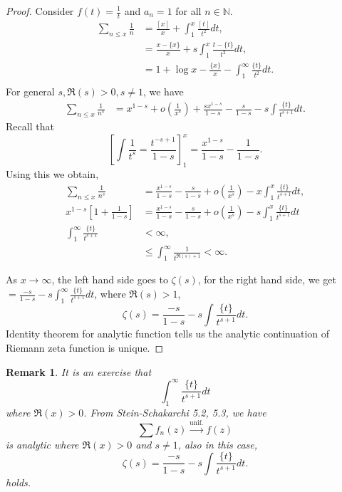 \documentclass{article}
\newtheorem{remark}{Remark}[section]
\newcommand{\N}[0]{\mathbb{N}}
\begin{document}
\begin{proof}Consider $f(t) = {\frac 1 {t}}$ and $a_n=1$ for all $n\in \N$. 
  \begin{align*}
    \sum_{n\leq x}{\frac 1 n} &= {\frac {[x]} x}+\int_1^x{\frac {[t]} {t^2}}dt,\\
    & = {\frac {x-\{x\}} {x}}+s\int_1^x {\frac {t-\{t\}} {t^{2}}}dt,\\
    & = 1+\log x-{\frac {\{x\}} x}-\int_1^\infty {\frac {\{ t\}} {t^2}}dt.\\
  \end{align*}
  For general $s,\Re(s)>0,s\not=1$, we have
  \begin{align*}
    \sum_{n\leq x}{\frac 1 {n^s}}& = x^{1-s}+o\left({\frac 1 {x^s}}\right)+{\frac {sx^{1-s}} {1-s}}-{\frac s {1-s}}-s\int{\frac {\{t\}} {t^{s+1}}}dt.
  \end{align*}
  Recall that 
  \begin{equation*}
    \left[\int{\frac 1 {t^s}} = {\frac {t^{-s+1}} {1-s}}\right]^x_1 = {\frac {x^{1-s}} {1-s}}-{\frac 1 {1-s}}.
  \end{equation*}
  Using this we obtain,
  \begin{align*}
    \sum_{n\leq x}{\frac 1 {n^s}}& = {\frac {x^{1-s}} {1-s}}-{\frac s {1-s}}+o\left({\frac 1 {x^s}}\right)-x\int_1^x{\frac {\{t\}} {t^{s+1}}}dt,\\
    x^{1-s}\left[1+{\frac 1 {1-s}}\right] &= {\frac {x^{1-s}} {1-s}}-{\frac s {1-s}}+o\left({\frac 1 {x^s}}\right)-s\int_1^x{\frac {\{t\}} {t^{s+1}}}dt\\
    \int_1^\infty {\frac {\{t\}} {t^{s+1}}} &< \infty,\\
    & \leq \int_1^\infty {\frac 1 {t^{\Re(s)+1}}}<\infty.
  \end{align*}
  \par As $x\to \infty$, the left hand side goes to $\zeta(s)$, for the right hand side, we get $={\frac {-s} {1-s}}-s\int_1^\infty{\frac {\{t\}} {t^{s+1}}}dt$,
  where $\Re(s)>1$, 
  \begin{equation*}
    \zeta(s) = {\frac {-s} {1-s}}-s\int{\frac {\{t\}} {t^{s+1}}}dt .
  \end{equation*}
  Identity theorem for analytic function tells us the analytic continuation of Riemann zeta function is unique.
\end{proof}
\begin{remark}
  It is an exercise that 
  \begin{equation*}
    \int_{1}^\infty {\frac {\{t\}} {t^{s+1}}}dt 
  \end{equation*}
  where $\Re(x)>0$. From Stein-Schakarchi 5.2, 5.3, we have 
  \begin{equation*}
    \sum f_n(z)\stackrel{\text{unif.}}{\to}f(z)
  \end{equation*}
  is analytic where $\Re(x)>0$ and $s\not=1$, also in this case,
    \begin{equation*}
    \zeta(s) = {\frac {-s} {1-s}}-s\int{\frac {\{t\}} {t^{s+1}}}dt .
  \end{equation*}
  holds.
\end{remark}
\end{document}
